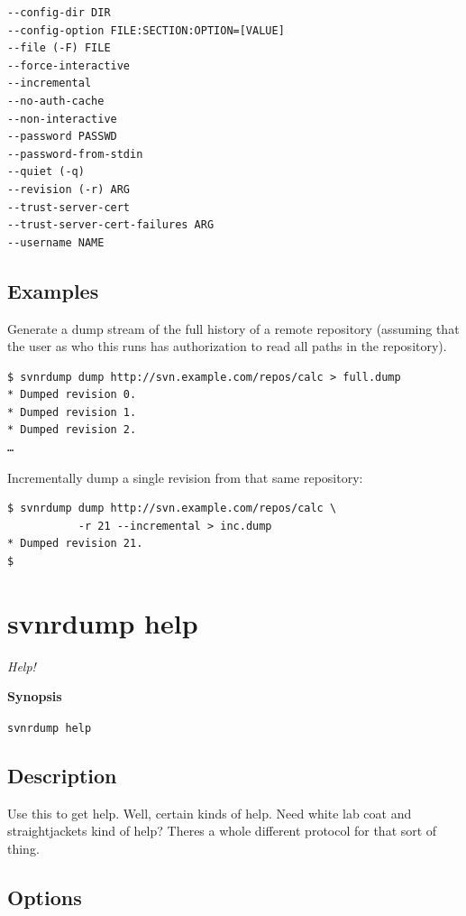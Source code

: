 \begin{verbatim}
--config-dir DIR
--config-option FILE:SECTION:OPTION=[VALUE]
--file (-F) FILE
--force-interactive
--incremental
--no-auth-cache
--non-interactive
--password PASSWD
--password-from-stdin
--quiet (-q)
--revision (-r) ARG
--trust-server-cert
--trust-server-cert-failures ARG
--username NAME
\end{verbatim}

\subsection{Examples}

Generate a dump stream of the full history of a remote repository
(assuming that the user as who this runs has authorization to read all
paths in the repository).

\begin{verbatim}
$ svnrdump dump http://svn.example.com/repos/calc > full.dump
* Dumped revision 0.
* Dumped revision 1.
* Dumped revision 2.
…
\end{verbatim}

Incrementally dump a single revision from that same repository:

\begin{verbatim}
$ svnrdump dump http://svn.example.com/repos/calc \
           -r 21 --incremental > inc.dump
* Dumped revision 21.
$
\end{verbatim}

\section{svnrdump help}\label{svn.ref.svnrdump.c.help}

\emph{Help!}

\textbf{Synopsis}

\texttt{svnrdump\ help}

\subsection{Description}

Use this to get help. Well, certain kinds of help. Need white lab coat
and straightjackets kind of help? There\textquotesingle s a whole
different protocol for that sort of thing.

\subsection{Options}

